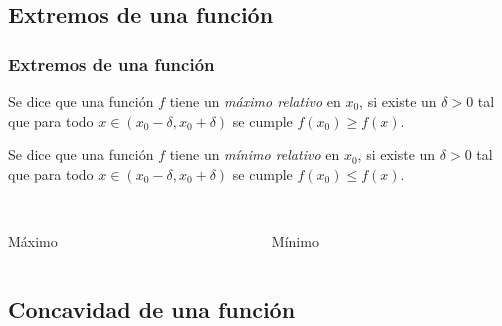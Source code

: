 \subsection{Extremos de una función}
\begin{frame}
\frametitle{Extremos de una función}
\begin{definicion}
Se dice que una función $f$ tiene un \emph{máximo relativo} en $x_0$, si existe un $\delta>0$ tal que para todo $x\in
(x_0-\delta,x_0+\delta)$ se cumple $f(x_0)\geq f(x)$.

Se dice que una función $f$ tiene un \emph{mínimo relativo} en $x_0$, si existe un $\delta>0$ tal que para todo $x\in
(x_0-\delta,x_0+\delta)$ se cumple $f(x_0)\leq f(x)$.
\end{definicion}

\begin{columns}
\begin{column}{0.4\textwidth}
\begin{center}
\scalebox{1}{}\\
\color{red}Máximo
\end{center}
\end{column}
\begin{column}{0.4\textwidth}
\begin{center}
\scalebox{1}{}\\
\color{red}Mínimo
\end{center}
\end{column}
\end{columns}
\end{frame} 


\subsection{Concavidad de una función}

